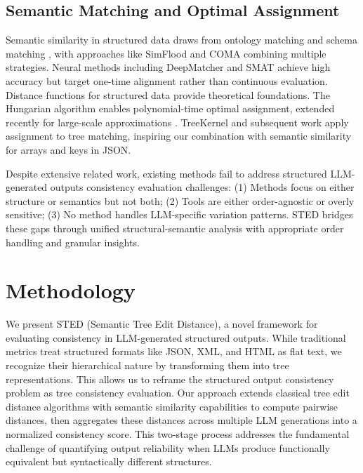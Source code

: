 \documentclass{article}
\begin{document}
\subsection{Semantic Matching and Optimal Assignment}
Semantic similarity in structured data draws from ontology matching \cite{Euzenat2013} and schema matching \cite{Rahm2001}, with approaches like SimFlood \cite{Melnik2002} and COMA \cite{Do2002} combining multiple strategies. Neural methods including DeepMatcher \cite{Mudgal2018} and SMAT \cite{Zhang2021smat} achieve high accuracy but target one-time alignment rather than continuous evaluation. Distance functions for structured data \cite{ontanon2020overview, kriegel2005similarity, yang2005similarity} provide theoretical foundations.
The Hungarian algorithm \cite{Kuhn1955, Munkres1957} enables polynomial-time optimal assignment, extended recently for large-scale approximations \cite{Schwiegelshohn2022}. TreeKernel \cite{Collins2001} and subsequent work \cite{Moschitti2006} apply assignment to tree matching, inspiring our combination with semantic similarity for arrays and keys in JSON.

Despite extensive related work, existing methods fail to address structured LLM-generated outputs consistency evaluation challenges:
(1) Methods focus on either structure or semantics but not both;
(2) Tools are either order-agnostic or overly sensitive;
(3) No method handles LLM-specific variation patterns.
STED bridges these gaps through unified structural-semantic analysis with appropriate order handling and granular insights.
\vspace{-3mm}
\section{Methodology}
\vspace{-3mm}
We present STED (Semantic Tree Edit Distance), a novel framework for evaluating consistency in LLM-generated structured outputs. While traditional metrics treat structured formats like JSON, XML, and HTML as flat text, we recognize their hierarchical nature by transforming them into tree representations. This allows us to reframe the structured output consistency problem as tree consistency evaluation. Our approach extends classical tree edit distance algorithms with semantic similarity capabilities to compute pairwise distances, then aggregates these distances across multiple LLM generations into a normalized consistency score. This two-stage process addresses the fundamental challenge of quantifying output reliability when LLMs produce functionally equivalent but syntactically different structures.
\end{document}
